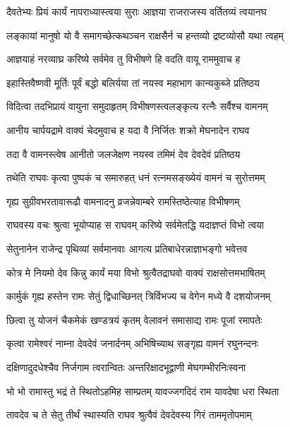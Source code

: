 \twolineshloka
{दैवतेभ्यः प्रियं कार्यं नापराध्यास्त्वया सुराः}
{आज्ञया राजराजस्य वर्तितव्यं त्वयानघ}%

\twolineshloka
{लङ्कायां मानुषो यो वै समागच्छेत्कथञ्चन}
{राक्षसैर्न च हन्तव्यो द्रष्टव्योसौ यथा त्वहम्}%


\twolineshloka
{आज्ञयाहं नरव्याघ्र करिष्ये सर्वमेव तु}
{विभीषणे हि वदति वायू राममुवाच ह}%

\twolineshloka
{इहास्तिवैष्णवी मूर्तिः पूर्वं बद्धो बलिर्यया}
{तां नयस्व महाभाग कान्यकुब्जे प्रतिष्ठय}%

\twolineshloka
{विदित्वा तदभिप्रायं वायुना समुदाहृतम्}
{विभीषणस्त्वलङ्कृत्य रत्नैः सर्वैश्च वामनम्}%

\twolineshloka
{आनीय चार्पयद्रामे वाक्यं चेदमुवाच ह}
{यदा वै निर्जितः शक्रो मेघनादेन राघव}%

\twolineshloka
{तदा वै वामनस्त्वेष आनीतो जलजेक्षण}
{नयस्व तमिमं देव देवदेवं प्रतिष्ठय}%

\twolineshloka
{तथेति राघवः कृत्वा पुष्पकं च समारुहत्}
{धनं रत्नमसङ्ख्येयं वामनं च सुरोत्तमम्}%

\twolineshloka
{गृह्य सुग्रीवभरतावारूढौ वामनादनु}
{व्रजन्नेवाम्बरे रामस्तिष्ठेत्याह विभीषणम्}%

\twolineshloka
{राघवस्य वचः श्रुत्वा भूयोप्याह स राघवम्}
{करिष्ये सर्वमेतद्धि यदाज्ञप्तं विभो त्वया}%

\twolineshloka
{सेतुनानेन राजेन्द्र पृथिव्यां सर्वमानवाः}
{आगत्य प्रतिबाधेरन्नाज्ञाभङ्गो भवेत्तव}%

\twolineshloka
{कोत्र मे नियमो देव किन्नु कार्यं मया विभो}
{श्रुत्वैतद्राघवो वाक्यं राक्षसोत्तमभाषितम्}%

\twolineshloka
{कार्मुकं गृह्य हस्तेन रामः सेतुं द्विधाच्छिनत्}
{त्रिर्विभज्य च वेगेन मध्ये वै दशयोजनम्}%

\twolineshloka
{छित्वा तु योजनं चैकमेकं खण्डत्रयं कृतम्}
{वेलावनं समासाद्य रामः पूजां रमापतेः}%

\twolineshloka
{कृत्वा रामेश्वरं नाम्ना देवदेवं जनार्दनम्}
{अभिषिच्याथ सङ्गृह्य वामनं रघुनन्दनः}%

\twolineshloka
{दक्षिणादुदधेश्चैव निर्जगाम त्वरान्वितः}
{अन्तरिक्षादभूद्वाणी मेघगम्भीरनिःस्वना}%


\twolineshloka
{भो भो रामास्तु भद्रं ते स्थितोऽहमिह साम्प्रतम्}
{यावज्जगदिदं राम यावदेषा धरा स्थिता}%

\twolineshloka
{तावदेव च ते सेतु तीर्थं स्थास्यति राघव}
{श्रुत्वैवं देवदेवस्य गिरं ताममृतोपमाम्}%

